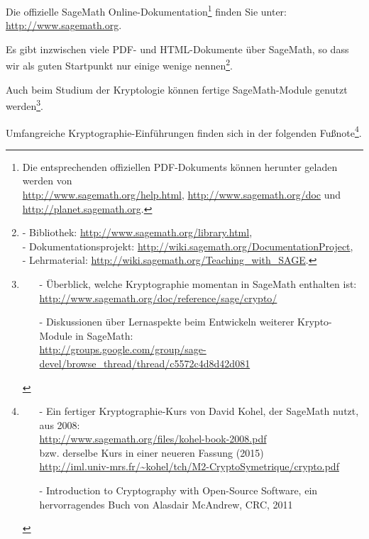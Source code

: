 Die offizielle SageMath Online-Dokumentation\footnote{%
  Die entsprechenden offiziellen PDF-Dokuments können herunter geladen werden von\\
  \url{http://www.sagemath.org/help.html}, \url{http://www.sagemath.org/doc} und \url{http://planet.sagemath.org}.
} finden Sie unter: \url{http://www.sagemath.org}.


Es gibt inzwischen viele PDF- und HTML-Dokumente über SageMath, so dass wir als guten Startpunkt nur einige wenige nennen\footnote{%
- \glqq Bibliothek\grqq: {\centering \url{http://www.sagemath.org/library.html}},\\
- \glqq Dokumentationsprojekt\grqq:
  {\centering \url{http://wiki.sagemath.org/DocumentationProject}},\\
- \glqq Lehrmaterial\grqq: {\centering \url{http://wiki.sagemath.org/Teaching_with_SAGE}}.
}.

Auch beim Studium der Kryptologie können fertige SageMath-Module genutzt
werden\footnote{%
\begin{itemize}
\item[-]
Überblick,
   welche Kryptographie momentan in SageMath enthalten ist:\\
   \url{http://www.sagemath.org/doc/reference/sage/crypto/}
\item[-]Diskussionen
   über Lernaspekte beim Entwickeln weiterer Krypto-Module in SageMath:\\
   \url{http://groups.google.com/group/sage-devel/browse_thread/thread/c5572c4d8d42d081}
\end{itemize}
}.

Umfangreiche Kryptographie-Einführungen finden sich in der folgenden Fußnote\footnote{%
\begin{itemize}
\item[-]
Ein fertiger Kryptographie-Kurs von David Kohel,
  der SageMath nutzt, aus 2008:\\
  \url{http://www.sagemath.org/files/kohel-book-2008.pdf}\\
  bzw. derselbe Kurs in einer neueren Fassung (2015)\\
  \url{http://iml.univ-mrs.fr/~kohel/tch/M2-CryptoSymetrique/crypto.pdf}
\item[-]\glqq Introduction to Cryptography with
  Open-Source Software\grqq, ein hervorragendes Buch von Alasdair McAndrew, CRC, 2011
\end{itemize}
}.


